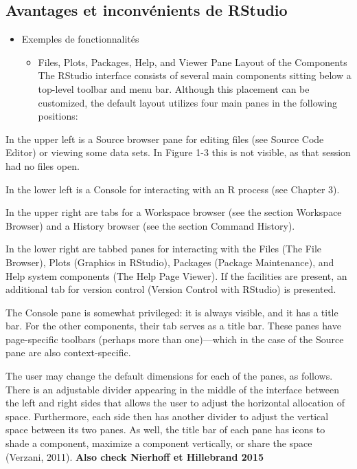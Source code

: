 \documentclass[
  letterpaper,
]{scrbook}
\providecommand{\tightlist}{%
  \setlength{\itemsep}{0pt}\setlength{\parskip}{0pt}}\usepackage{longtable,booktabs,array}
\begin{document}
\hypertarget{avantages-et-inconvuxe9nients-de-rstudio-1}{%
\subsection{Avantages et inconvénients de
RStudio}\label{avantages-et-inconvuxe9nients-de-rstudio-1}}

\begin{itemize}
\tightlist
\item
  Exemples de fonctionnalités

  \begin{itemize}
  \tightlist
  \item
    Files, Plots, Packages, Help, and Viewer Pane Layout of the
    Components The RStudio interface consists of several main components
    sitting below a top-level toolbar and menu bar. Although this
    placement can be customized, the default layout utilizes four main
    panes in the following positions:
  \end{itemize}
\end{itemize}

In the upper left is a Source browser pane for editing files (see Source
Code Editor) or viewing some data sets. In Figure 1-3 this is not
visible, as that session had no files open.

In the lower left is a Console for interacting with an R process (see
Chapter 3).

In the upper right are tabs for a Workspace browser (see the section
Workspace Browser) and a History browser (see the section Command
History).

In the lower right are tabbed panes for interacting with the Files (The
File Browser), Plots (Graphics in RStudio), Packages (Package
Maintenance), and Help system components (The Help Page Viewer). If the
facilities are present, an additional tab for version control (Version
Control with RStudio) is presented.

The Console pane is somewhat privileged: it is always visible, and it
has a title bar. For the other components, their tab serves as a title
bar. These panes have page-specific toolbars (perhaps more than
one)---which in the case of the Source pane are also context-specific.

The user may change the default dimensions for each of the panes, as
follows. There is an adjustable divider appearing in the middle of the
interface between the left and right sides that allows the user to
adjust the horizontal allocation of space. Furthermore, each side then
has another divider to adjust the vertical space between its two panes.
As well, the title bar of each pane has icons to shade a component,
maximize a component vertically, or share the space (Verzani, 2011).
\textbf{Also check Nierhoff et Hillebrand 2015}
\end{document}
